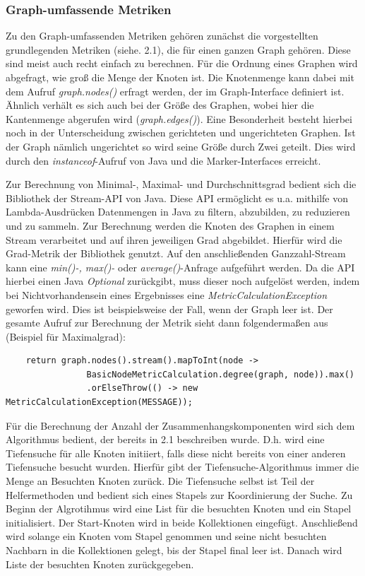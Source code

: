 \documentclass[a4paper,12pt,ngerman,chapterprefix=false,listof=totoc,bibliography=totoc]{scrreprt}
\begin{document}
{{\subsubsection*{Graph-umfassende Metriken}
{
Zu den Graph-umfassenden Metriken gehören zunächst die vorgestellten grundlegenden Metriken (siehe. 2.1), die für einen ganzen Graph gehören. Diese sind meist auch recht einfach zu berechnen. Für die Ordnung eines Graphen wird abgefragt, wie groß die Menge der Knoten ist. Die Knotenmenge kann dabei mit dem Aufruf \textit{graph.nodes()} erfragt werden, der im Graph-Interface definiert ist. Ähnlich verhält es sich auch bei der Größe des Graphen, wobei hier die Kantenmenge abgerufen wird (\textit{graph.edges()}). Eine Besonderheit besteht hierbei noch in der Unterscheidung zwischen gerichteten und ungerichteten Graphen. Ist der Graph nämlich ungerichtet so wird seine Größe durch Zwei geteilt. Dies wird durch den \textit{instanceof}-Aufruf von Java und die Marker-Interfaces erreicht.

Zur Berechnung von Minimal-, Maximal- und Durchschnittsgrad bedient sich die Bibliothek der Stream-API von Java. Diese API ermöglicht es u.a. mithilfe von Lambda-Ausdrücken Datenmengen in Java zu filtern, abzubilden, zu reduzieren und zu sammeln. \cite{ullenboom_java_2014} Zur Berechnung werden die Knoten des Graphen in einem Stream verarbeitet und auf ihren jeweiligen Grad abgebildet. Hierfür wird die Grad-Metrik der Bibliothek genutzt. Auf den anschließenden Ganzzahl-Stream kann eine \textit{min()-, max()-} oder \textit{average()}-Anfrage aufgeführt werden. Da die API hierbei einen Java \textit{Optional} zurückgibt, muss dieser noch aufgelöst werden, indem bei Nichtvorhandensein eines Ergebnisses eine \textit{MetricCalculationException} geworfen wird. Dies ist beispielsweise der Fall, wenn der Graph leer ist. Der gesamte Aufruf zur Berechnung der Metrik sieht dann folgendermaßen aus (Beispiel für Maximalgrad):
\begin{lstlisting}
	return graph.nodes().stream().mapToInt(node ->
				BasicNodeMetricCalculation.degree(graph, node)).max()
				.orElseThrow(() -> new MetricCalculationException(MESSAGE));
\end{lstlisting}
Für die Berechnung der Anzahl der Zusammenhangskomponenten wird sich dem Algorithmus bedient, der bereits in 2.1 beschreiben wurde. D.h. wird eine Tiefensuche für alle Knoten initiiert, falls diese nicht bereits von einer anderen Tiefensuche besucht wurden. Hierfür gibt der Tiefensuche-Algorithmus immer die Menge an Besuchten Knoten zurück. Die Tiefensuche selbst ist Teil der Helfermethoden und bedient sich eines Stapels zur Koordinierung der Suche. Zu Beginn der Algrotihmus wird eine List für die besuchten Knoten und ein Stapel initialisiert. Der Start-Knoten wird in beide Kollektionen eingefügt. Anschließend wird solange ein Knoten vom Stapel genommen und seine nicht besuchten Nachbarn in die Kollektionen gelegt, bis der Stapel final leer ist. Danach wird Liste der besuchten Knoten zurückgegeben.

}}}
\end{document}
